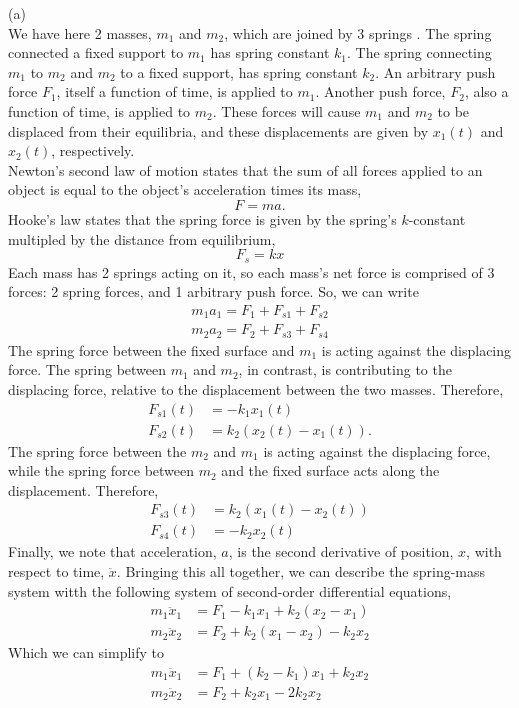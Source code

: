 \documentclass[a4paper, 11pt]{report}
\begin{document}
\sol (a) \\
We have here 2 masses, $m_1$ and $m_2$, which are joined by 3 springs . The spring connected a fixed support to $m_1$ has spring constant $k_1$. The spring connecting $m_1$ to $m_2$ and $m_2$ to a fixed support, has spring constant $k_2$. An arbitrary push force $F_1$, itself a function of time, is applied to $m_1$. Another push force, $F_2$, also a function of time, is applied to $m_2$. These forces will cause $m_1$ and $m_2$ to be displaced from their equilibria, and these displacements are given by $x_1(t)$ and $x_2(t)$, respectively. \\

Newton's second law of motion states that the sum of all forces applied to an object is equal to the object's acceleration times its mass,
$$
  F = ma.
$$
Hooke's law states that the spring force is given by the spring's $k$-constant multipled by the distance from equilibrium,
$$
  F_s = kx
$$ 
Each mass has 2 springs acting on it, so each mass's net force is comprised of 3 forces: 2 spring forces, and 1 arbitrary push force. So, we can write
\begin{gather*}
  m_1a_1 = F_1 + F_{s1} + F_{s2} \\ 
  m_2a_2 = F_2 + F_{s3} + F_{s4}
\end{gather*}
\newpage
The spring force between the fixed surface and $m_1$ is acting against the displacing force. The spring between $m_1$ and $m_2$, in contrast, is contributing to the displacing force, relative to the displacement between the two masses. Therefore,
\begin{align*}
  F_{s1}(t) &= -k_1x_1(t) \\
  F_{s2}(t) &= k_2(x_2(t) - x_1(t)).
\end{align*}
The spring force between the $m_2$ and $m_1$ is acting against the displacing force, while the spring force between $m_2$ and the fixed surface acts along the displacement. Therefore,
\begin{align*}
  F_{s3}(t) &= k_2(x_1(t) - x_2(t)) \\
  F_{s4}(t) &= -k_2x_2(t)
\end{align*}
Finally, we note that acceleration, $a$, is the second derivative of position, $x$, with respect to time, $\ddot{x}$. Bringing this all together, we can describe the spring-mass system witth the following system of second-order differential equations,
\begin{align*}
  m_1\ddot{x}_1 &= F_1 - k_1x_1 + k_2(x_2 - x_1) \\ 
  m_2\ddot{x}_2 &= F_2 + k_2(x_1 - x_2) - k_2x_2
\end{align*}
Which we can simplify to
\begin{align*}
  m_1\ddot{x}_1 &= F_1 + (k_2 - k_1)x_1 + k_2x_2 \\ 
  m_2\ddot{x}_2 &= F_2 + k_2x_1 - 2k_2x_2
\end{align*}
\end{document}
